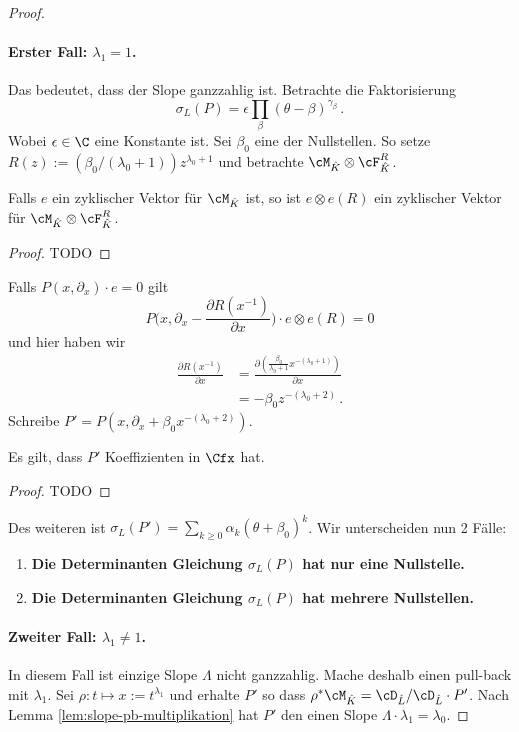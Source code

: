 \begin{proof}
\paragraph{Erster Fall: $\lambda_1=1$.} Das bedeutet, dass der Slope ganzzahlig
ist. Betrachte die Faktorisierung
\[
\sigma_L(P)=\epsilon\prod_{\beta}(\theta-\beta)^{\gamma_\beta}\,.
\]
Wobei $\epsilon\in\C$ eine Konstante ist.  Sei $\beta_0$  eine der Nullstellen.
So setze $R(z):=(\beta_0/(\lambda_0+1))z^{\lambda_0+1}$ und betrachte
$\cM_{\hat K}\otimes \cF_{\hat K}^R$.
\begin{lem}
Falls $e$ ein zyklischer Vektor für $\cM_{\hat K}$ ist, so ist $e\otimes e(R)$
ein zyklischer Vektor für $\cM_{\hat K}\otimes \cF_{\hat K}^R$.
\end{lem}
\begin{proof}
TODO
\end{proof}
\begin{comment}
AB HIER VLT NICHT RICHTIG, nur versuch
\end{comment}
Falls $P(x,\partial_x)\cdot e=0$ gilt
\[
P\Big(x,\partial_x-\frac{\partial R(x^{-1})}{\partial x}\Big)
  \cdot e\otimes e(R)=0
\]
und hier haben wir 
\begin{align*}
\frac{\partial R(x^{-1})}{\partial x} 
  &=\frac{\partial(\frac{\beta_0}{\lambda_0+1}x^{-(\lambda_0+1)})}{\partial
  x}\\
  &=-\beta_0z^{-(\lambda_0+2)} \,.
\end{align*}
Schreibe $P'=P(x,\partial_x+\beta_0x^{-(\lambda_0+2)})$.
\begin{lem}
Es gilt, dass $P'$ Koeffizienten in $\Cfx$ hat.
\end{lem}
\begin{proof}
TODO
\end{proof}
Des weiteren ist $\sigma_L(P')=\sum_{k\geq 0}\alpha_k(\theta+\beta_0)^k$. Wir
unterscheiden nun 2 Fälle:
\begin{enumerate}
\item \textbf{Die Determinanten Gleichung $\sigma_L(P)$ hat nur eine
Nullstelle.}
\begin{comment}TODO: Hier weiter \end{comment}
\item \textbf{Die Determinanten Gleichung $\sigma_L(P)$ hat mehrere
Nullstellen.}
\begin{comment}TODO: Hier weiter \end{comment}
\end{enumerate}

\paragraph{Zweiter Fall: $\lambda_1\neq1$.} In diesem Fall ist einzige Slope
$\Lambda$ nicht ganzzahlig. Mache deshalb einen pull-back mit $\lambda_1$. Sei
$\rho:t\mapsto x:=t^{\lambda_1}$ und erhalte $P'$ so dass $\rho^*\cM_{\hat
K}=\cD_{\hat L}/\cD_{\hat L}\cdot P'$. Nach Lemma
\ref{lem:slope-pb-multiplikation} hat $P'$ den einen Slope
$\Lambda\cdot\lambda_1=\lambda_0$.
\begin{comment}TODO: Hier weiter \end{comment}


\end{proof}

